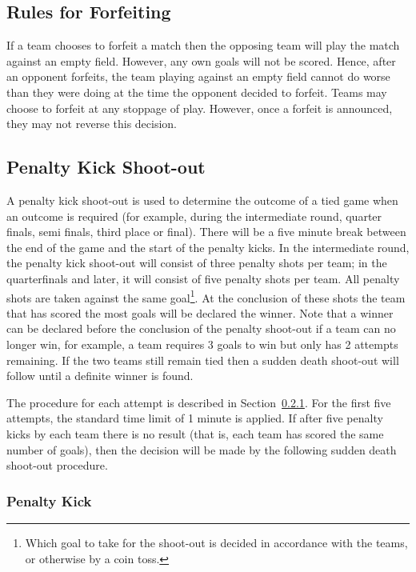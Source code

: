 \documentclass[12pt]{article}
\begin{document}
\subsection{Rules for Forfeiting}
\label{sec:forfeit}

If a team chooses to forfeit a match then the opposing team will play the match against an empty field.  However, any own goals will not be scored.  Hence, after an opponent forfeits, the team playing against an empty field cannot do worse than they were doing at the time the opponent decided to forfeit.  Teams may choose to forfeit at any stoppage of play.  However, once a forfeit is announced, they may not reverse this decision.


\subsection{Penalty Kick Shoot-out}
\label{sec:penalty_shoot-out}

A penalty kick shoot-out is used to determine the outcome of a tied game when an outcome is required (for example, during the intermediate round, quarter finals, semi finals, third place or final). 
There will be a five minute break between the end of the game and the start of the penalty kicks.
In the intermediate round, the penalty kick shoot-out will consist of three penalty shots per team; in the quarterfinals and later, it will consist of five penalty shots per team.
All penalty shots are taken against the same goal\footnote{Which goal to take for the shoot-out is decided in accordance with the teams, or otherwise by a coin toss.}. At the conclusion of these shots the team that has scored the most goals will be declared the winner. Note that a winner can be declared before the conclusion of the penalty shoot-out if a team can no longer win, for example, a team requires 3 goals to win but only has 2 attempts remaining. If the two teams still remain tied then a sudden death shoot-out will follow until a definite winner is found.

The procedure for each attempt is described in Section~\ref{sec:penalty_kick}. For the first five attempts, the standard time limit of 1 minute is applied. If after five penalty kicks by each team there is no result (that is, each team has scored the same number of goals), then the decision will be made by the following sudden death shoot-out procedure.

\subsubsection{Penalty Kick}
\label{sec:penalty_kick}
\end{document}
